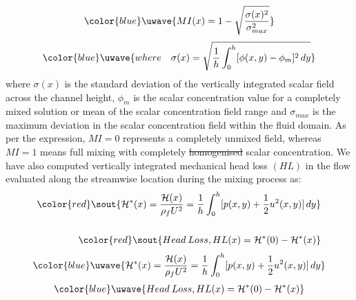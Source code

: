 \documentclass[%
aip,
amsmath,amssymb,
reprint,
]{revtex4-1}
\providecommand{\DIFadd}[1]{{\protect\color{blue}\uwave{#1}}} %
\providecommand{\DIFdel}[1]{{\protect\color{red}\sout{#1}}}                      %
\providecommand{\DIFaddbegin}{} %
\providecommand{\DIFaddend}{} %
\providecommand{\DIFdelbegin}{} %
\providecommand{\DIFdelend}{} %
\newcommand{\DIFscaledelfig}{0.5}
\newlength{\DIFdelgraphicswidth} %
\newlength{\DIFdelgraphicsheight} %
\newcommand{\DIFaddincludegraphics}[2][]{{\color{blue}\fbox{\DIFOincludegraphics[#1]{#2}}}} %
\newcommand{\DIFdelincludegraphics}[2][]{%
\sbox{\DIFdelgraphicsbox}{\DIFOincludegraphics[#1]{#2}}%
\settoboxwidth{\DIFdelgraphicswidth}{\DIFdelgraphicsbox} %
\settoboxtotalheight{\DIFdelgraphicsheight}{\DIFdelgraphicsbox} %
\scalebox{\DIFscaledelfig}{%
\parbox[b]{\DIFdelgraphicswidth}{\usebox{\DIFdelgraphicsbox}\\[-\baselineskip] \rule{\DIFdelgraphicswidth}{0em}}\llap{\resizebox{\DIFdelgraphicswidth}{\DIFdelgraphicsheight}{%
\setlength{\unitlength}{\DIFdelgraphicswidth}%
\begin{picture}(1,1)%
\thicklines\linethickness{2pt} %
{\color[rgb]{1,0,0}\put(0,0){\framebox(1,1){}}}%
{\color[rgb]{1,0,0}\put(0,0){\line( 1,1){1}}}%
{\color[rgb]{1,0,0}\put(0,1){\line(1,-1){1}}}%
\end{picture}%
}\hspace*{3pt}}} %
} %
\DeclareRobustCommand{\DIFaddbegin}{\DIFOaddbegin \let\includegraphics\DIFaddincludegraphics} %
\DeclareRobustCommand{\DIFaddend}{\DIFOaddend \let\includegraphics\DIFOincludegraphics} %
\DeclareRobustCommand{\DIFdelbegin}{\DIFOdelbegin \let\includegraphics\DIFdelincludegraphics} %
\DeclareRobustCommand{\DIFdelend}{\DIFOaddend \let\includegraphics\DIFOincludegraphics} %
\begin{document}
\DIFdelend \DIFaddbegin \begin{eqnarray}
				\DIFadd{MI(x)=1-\sqrt{\frac{\sigma(x)^2}{{\sigma^2_{max}}}}
			}\end{eqnarray}
			\begin{eqnarray}
				\DIFadd{where \quad \sigma(x)=\sqrt{{1\over h} \int_{0}^{h} [\phi(x,y)-\phi_m]^2 \,dy}
			}\end{eqnarray}\DIFaddend 
			where $\sigma(x)$ is the standard deviation of the vertically integrated scalar field across the channel height, $\phi_m$ is the scalar concentration value for a completely mixed solution or mean of the scalar concentration field range and $\sigma_{max}$ is the maximum deviation in the scalar concentration field within the fluid domain. As per the expression, $MI=0$ represents a completely unmixed field, whereas $MI=1$ means full mixing with completely \DIFdelbegin \DIFdel{homogenised }\DIFdelend \DIFaddbegin \DIFadd{homogenized }\DIFaddend scalar concentration. We have also computed vertically integrated mechanical head loss $(HL)$ in the flow evaluated along the streamwise location during the mixing process as:
			\DIFdelbegin \begin{align*}
	\DIFdel{\mathcal{H}^*(x)=\frac{\mathcal{H}(x)}{\rho_f U^2}=\frac{1}{h}\int_{0}^{h}[p(x,y)+{1\over2}  u^2(x,y)]\,dy }\\ \\\DIFdel{Head \: Loss, HL(x) = \mathcal{H}^*(0)-\mathcal{H}^*(x)
}\end{align*}%
\DIFdelend \DIFaddbegin \begin{eqnarray}
				\DIFadd{\mathcal{H}^*(x)=\frac{\mathcal{H}(x)}{\rho_f U^2}=\frac{1}{h}\int_{0}^{h}[p(x,y)+{1\over2}  u^2(x,y)]\,dy
			}\end{eqnarray}
			\begin{eqnarray}
				\DIFadd{Head \: Loss, HL(x) = \mathcal{H}^*(0)-\mathcal{H}^*(x)
			}\end{eqnarray}\DIFaddend 
\end{document}
